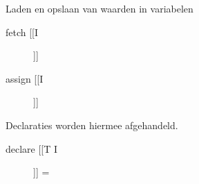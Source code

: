 Laden en opslaan van waarden in variabelen
\begin{description}
    \item[fetch [[I]]] 
    \item[assign [[I]]]
\end{description}

Declaraties worden hiermee afgehandeld.
\begin{description}
    \item[declare [[T I]]] = \hfill \\ 

\end{description}
\clearpage